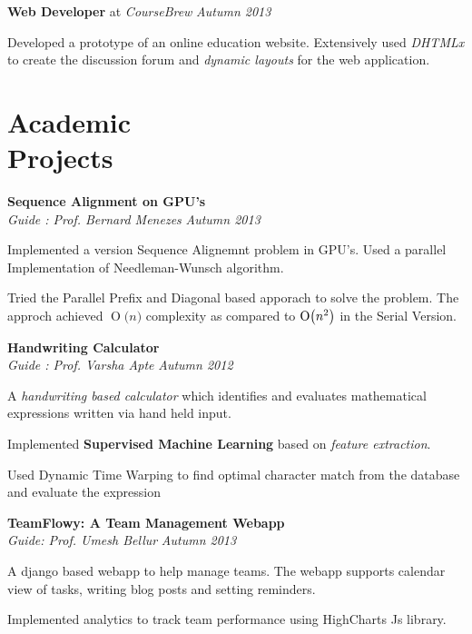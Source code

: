 \documentclass[margin,11pt]{resume}
\newcommand{\BigO}[1]{\ensuremath{\operatorname{O}\bigl(#1\bigr)}}
\begin{document}
\begin{resume}
\textbf{Web Developer} at \emph{CourseBrew} \hfill \emph{Autumn 2013} 
\begin{list2}
\item Developed a prototype of an online education website. Extensively used \emph{DHTMLx} to create the discussion forum and \emph{dynamic layouts} for the web application.
\end{list2}


\section{\mysidestyle Academic\\Projects}

\textbf{Sequence Alignment on GPU's} \\
\textsl{Guide : Prof. Bernard Menezes} \hfill \emph{Autumn 2013}
\begin{list2}
\item Implemented a version Sequence Alignemnt problem in GPU’s. Used a parallel
Implementation of Needleman-Wunsch algorithm.
\item Tried the Parallel Prefix and Diagonal based apporach to solve the problem. The
approch achieved \BigO{n} complexity as compared to \BigO{n\textsuperscript{2}} in the Serial Version.
\end{list2}


\textbf{Handwriting Calculator} \\
    \textsl{Guide : Prof. Varsha Apte} \hfill \emph{Autumn 2012}
\begin{list2}
\item A\emph{ handwriting based calculator} which identifies and evaluates mathematical expressions written via hand held input.
\item Implemented \textbf{Supervised Machine Learning} based on \emph{feature extraction}. 
\item Used Dynamic Time Warping to find optimal character match from the database and evaluate the expression
\end{list2}

\textbf{TeamFlowy: A Team Management Webapp}\\ \textsl{Guide: Prof. Umesh Bellur} \hfill \emph{Autumn 2013}
\begin{list2}
\item A django based webapp to help manage teams. The webapp supports calendar view of tasks, writing blog posts and setting reminders.
\item Implemented analytics to track team performance using HighCharts Js library. 
\end{list2}


\end{resume}
\end{document}
